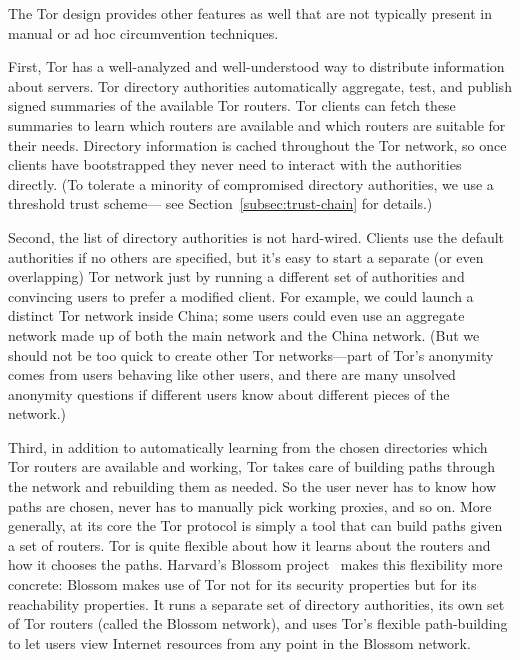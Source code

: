 \documentclass{llncs}
\begin{document}
The Tor design provides other features as well that are not typically
present in manual or ad hoc circumvention techniques.

First, Tor has a well-analyzed and well-understood way to distribute
information about servers.
Tor directory authorities automatically aggregate, test,
and publish signed summaries of the available Tor routers. Tor clients
can fetch these summaries to learn which routers are available and
which routers are suitable for their needs. Directory information is cached
throughout the Tor network, so once clients have bootstrapped they never
need to interact with the authorities directly. (To tolerate a minority
of compromised directory authorities, we use a threshold trust scheme---
see Section~\ref{subsec:trust-chain} for details.)

Second, the list of directory authorities is not hard-wired.
Clients use the default authorities if no others are specified,
but it's easy to start a separate (or even overlapping) Tor network just
by running a different set of authorities and convincing users to prefer
a modified client. For example, we could launch a distinct Tor network
inside China; some users could even use an aggregate network made up of
both the main network and the China network. (But we should not be too
quick to create other Tor networks---part of Tor's anonymity comes from
users behaving like other users, and there are many unsolved anonymity
questions if different users know about different pieces of the network.)

Third, in addition to automatically learning from the chosen directories
which Tor routers are available and working, Tor takes care of building
paths through the network and rebuilding them as needed. So the user
never has to know how paths are chosen, never has to manually pick
working proxies, and so on. More generally, at its core the Tor protocol
is simply a tool that can build paths given a set of routers. Tor is
quite flexible about how it learns about the routers and how it chooses
the paths. Harvard's Blossom project~\cite{blossom-thesis} makes this
flexibility more concrete: Blossom makes use of Tor not for its security
properties but for its reachability properties. It runs a separate set
of directory authorities, its own set of Tor routers (called the Blossom
network), and uses Tor's flexible path-building to let users view Internet
resources from any point in the Blossom network.
\end{document}
